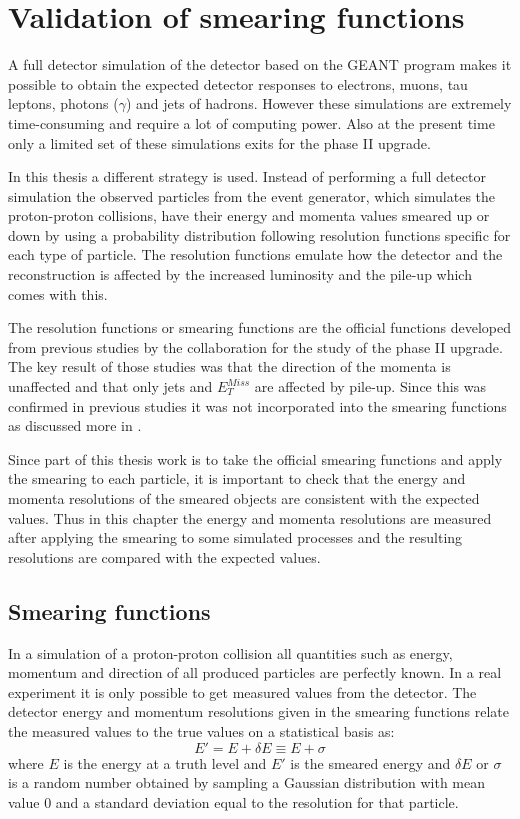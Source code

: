 \chapter{Validation of smearing functions}\label{cha:vali}
A full detector simulation of the \abbrATLAS detector based on the GEANT \citep{Geant4} program makes it possible to obtain the expected detector responses to electrons, muons, tau leptons, photons ($\gamma$) and jets of hadrons. However these simulations are extremely time-consuming and require a lot of computing power. Also at the present time only a limited set of these simulations exits for the \abbrATLAS phase II upgrade.

In this thesis a different strategy is used. Instead of performing a full detector simulation the observed particles from the event generator, which simulates the proton-proton collisions, have their energy and momenta values smeared up or down by using a probability distribution following resolution functions specific for each type of particle. The resolution functions emulate how the detector and the reconstruction is affected by the increased luminosity and the pile-up which comes with this. 

The resolution functions or smearing functions are the official functions developed from previous studies \citep{ATLAS:LOI2, ATL-PHYS-PUB-2013-004} by the \abbrATLAS collaboration for the study of the \abbrATLAS phase II upgrade. The key result of those studies was that the direction of the momenta is unaffected and that only jets and $E^{Miss}_T$ are affected by pile-up. Since this was confirmed in previous studies it was not incorporated into the smearing functions as discussed more in .

Since part of this thesis work is to take the official \abbrATLAS smearing functions and apply the smearing to each particle, it is important to check that the energy and momenta resolutions of the smeared objects are consistent with the expected values. Thus in this chapter the energy and momenta resolutions are measured after applying the smearing to some simulated processes and the resulting resolutions are compared with the expected values.

\newpage
\section{Smearing functions}\label{sec:smear}
In a simulation of a proton-proton collision all quantities such as energy, momentum and direction of all produced particles are perfectly known. In a real experiment it is only possible to get measured values from the detector. The detector energy and momentum resolutions given in the smearing functions relate the measured values to the true values on a statistical basis as:
\begin{equation}\label{eq:smear}
E' = E + \delta E \equiv E + \sigma
\end{equation}
where $E$ is the energy at a truth level and $E'$ is the smeared energy and $\delta E$ or $\sigma$ is a random number obtained by sampling a Gaussian distribution with mean value 0 and a standard deviation equal to the resolution for that particle.

